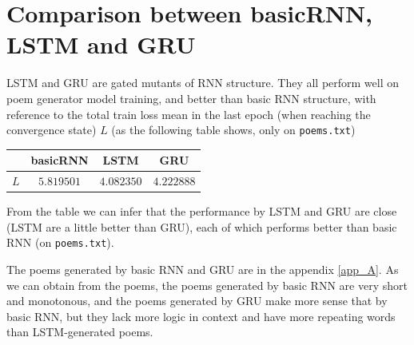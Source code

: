 \documentclass[10pt]{article}
\begin{document}
\section{Comparison between basicRNN, LSTM and GRU}
LSTM and GRU are gated mutants of RNN structure. They all perform well on poem generator model training, and better than basic RNN structure, with reference to the total train loss mean in the last epoch (when reaching the convergence state) $L$ (as the following table shows, only on \texttt{poems.txt})
\begin{center}
\begin{tabular}{|c|c|c|c|}
\hline
 & basicRNN & LSTM & GRU\\
\hline
$L$ & $5.819501$ & $4.082350$ & $4.222888$ \\
\hline
\end{tabular}
\end{center}
From the table we can infer that the performance by LSTM and GRU are close (LSTM are a little better than GRU), each of which performs better than basic RNN (on \texttt{poems.txt}).\par
The poems generated by basic RNN and GRU are in the appendix \ref{app_A}. As we can obtain from the poems, the poems generated by basic RNN are very short and monotonous, and the poems generated by GRU make more sense that by basic RNN, but they lack more logic in context and have more repeating words than LSTM-generated poems.
\clearpage


\clearpage
\appendix
\end{document}
